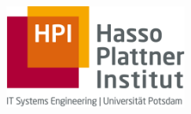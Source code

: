 \begin{titlepage}
	\begin{addmargin}[-1cm]{-3cm}
    \begin{center}
        \large

        \hfill

        \vfill

        \begingroup
            \color{Maroon}\spacedallcaps{\myTitle} \\
            \color{Black}\spacedlowsmallcaps{\mySubtitle}\\[1em]
            \color{Maroon}\spacedallcaps{\myTitleGer}\\
            \color{Black}\spacedlowsmallcaps{\mySubtitleGer}
            \\[3em]
        \endgroup

        {\color{Black}\spacedlowsmallcaps{\myName}\\
        \spacedlowsmallcaps{\myTime}}



        \vfill

        \includegraphics[width=6cm]{gfx/logo.jpg} \\ \medskip

        \myFaculty \\
        \myProf\\
        \mySupervisor


        \vfill

    \end{center}
  \end{addmargin}
\end{titlepage}